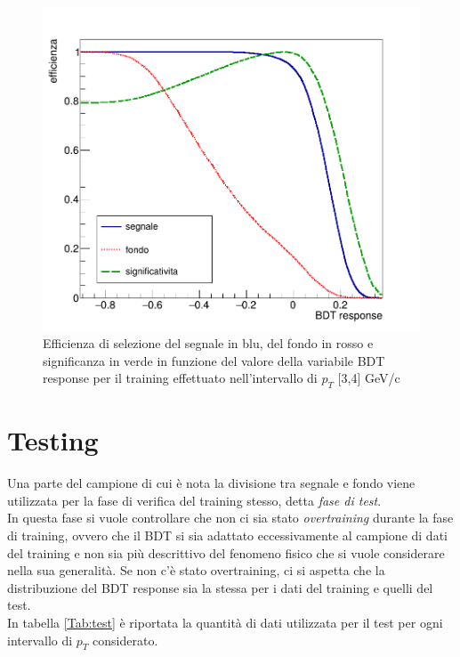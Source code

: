     \begin{figure}[htbp] 
        \centering
        \includegraphics[width=0.7\linewidth]{training&testing/eff_significanza.png}
        \caption{Efficienza di selezione del segnale in blu, del fondo in rosso e significanza in verde in funzione del valore della variabile BDT response per il training effettuato nell'intervallo di $p_T$ [3,4] GeV/c }
        \label{fig:efficienza}
    \end{figure}

\section{Testing} \label{testing}
    Una parte del campione di cui è nota la divisione tra segnale e fondo viene utilizzata per la fase di verifica del training stesso, detta \textit{fase di test}. 
    \\In questa fase si vuole controllare che non ci sia stato \textit{overtraining} durante la fase di training, ovvero che il BDT si sia adattato eccessivamente al campione di dati del training e non sia più descrittivo del fenomeno fisico che si vuole considerare nella  sua generalità. Se non c'è stato overtraining, ci si aspetta che la distribuzione del BDT response sia la stessa per i dati del training e quelli del test. 
    \\In tabella \ref{Tab:test} è riportata la quantità di dati utilizzata per il test per ogni intervallo di $p_T$ considerato.
    

